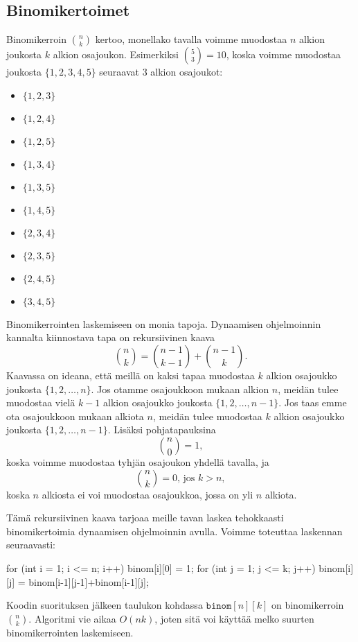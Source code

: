 \subsection{Binomikertoimet}

Binomikerroin $\binom{n}{k}$ kertoo, monellako tavalla voimme
muodostaa $n$ alkion joukosta $k$ alkion osajoukon.
Esimerkiksi $\binom{5}{3}=10$, koska voimme muodostaa
joukosta $\{1,2,3,4,5\}$ seuraavat 3 alkion osajoukot:

\begin{multicols}{3}
\begin{itemize}
\item $\{1,2,3\}$
\item $\{1,2,4\}$
\item $\{1,2,5\}$
\item $\{1,3,4\}$
\item $\{1,3,5\}$
\item $\{1,4,5\}$
\item $\{2,3,4\}$
\item $\{2,3,5\}$
\item $\{2,4,5\}$
\item $\{3,4,5\}$
\end{itemize}
\end{multicols}

Binomikerrointen laskemiseen on monia tapoja.
Dynaamisen ohjelmoinnin kannalta kiinnostava tapa on rekursiivinen kaava
\[\binom{n}{k} = \binom{n-1}{k-1} + \binom{n-1}{k}.\]
Kaavassa on ideana, että meillä on kaksi tapaa muodostaa $k$ alkion osajoukko
joukosta $\{1,2,\dots,n\}$.
Jos otamme osajoukkoon mukaan alkion $n$, meidän tulee muodostaa
vielä $k-1$ alkion osajoukko joukosta $\{1,2,\dots,n-1\}$.
Jos taas emme ota osajoukkoon mukaan alkiota $n$, meidän tulee muodostaa
$k$ alkion osajoukko joukosta $\{1,2,\dots,n-1\}$.
Lisäksi pohjatapauksina
\[ \binom{n}{0} = 1,\]
koska voimme muodostaa tyhjän osajoukon yhdellä tavalla, ja
\[ \binom{n}{k} = 0,\,\textrm{jos $k>n$},\]
koska $n$ alkiosta ei voi muodostaa osajoukkoa, jossa on yli $n$ alkiota.

Tämä rekursiivinen kaava tarjoaa meille tavan laskea tehokkaasti
binomikertoimia dynaamisen ohjelmoinnin avulla.
Voimme toteuttaa laskennan seuraavasti:

\begin{code}
for (int i = 1; i <= n; i++) {
    binom[i][0] = 1;
    for (int j = 1; j <= k; j++) {
        binom[i][j] = binom[i-1][j-1]+binom[i-1][j];
    }
}
\end{code}

Koodin suorituksen jälkeen taulukon kohdassa
$\texttt{binom}[n][k]$ on binomikerroin $\binom{n}{k}$.
Algoritmi vie aikaa $O(nk)$, joten sitä voi käyttää
melko suurten binomikerrointen laskemiseen.